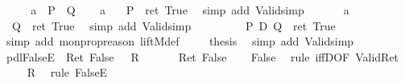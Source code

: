 \begin{isabellebody}
\isamarkupfalse%
\ {\isacharminus}\isanewline
\ \ \isamarkupfalse%
\ a{\isacharcolon}\ {\isachardoublequote}{\isasymturnstile}\ P{\isachardoublequote}\ {\isachardoublequote}{\isasymturnstile}\ Q{\isachardoublequote}\isanewline
\ \ \isamarkupfalse%
\ a\ \isamarkupfalse%
\ {\isachardoublequote}{\isasymDown}\ P\ {\isacharequal}\ ret\ True{\isachardoublequote}\ \isamarkupfalse%
\ {\isacharparenleft}simp\ add{\isacharcolon}\ Valid{\isacharunderscore}simp{\isacharparenright}\isanewline
\ \ \isamarkupfalse%
\isanewline
\ \ \isamarkupfalse%
\ a\ \isamarkupfalse%
\ {\isachardoublequote}{\isasymDown}\ Q\ {\isacharequal}\ ret\ True{\isachardoublequote}\ \isamarkupfalse%
\ {\isacharparenleft}simp\ add{\isacharcolon}\ Valid{\isacharunderscore}simp{\isacharparenright}\isanewline
\ \ \isamarkupfalse%
\ \isanewline
\ \ \isamarkupfalse%
\ {\isachardoublequote}{\isasymDown}\ {\isacharparenleft}P\ {\isasymand}\isactrlsub D\ Q{\isacharparenright}\ {\isacharequal}\ ret\ True{\isachardoublequote}\isanewline
\ \ \ \ \isamarkupfalse%
\ {\isacharparenleft}simp\ add{\isacharcolon}\ mon{\isacharunderscore}prop{\isacharunderscore}reason\ liftM{}{\isacharunderscore}def{\isacharparenright}\ \isanewline
\ \ \isamarkupfalse%
\ {\isacharquery}thesis\ \isamarkupfalse%
\ {\isacharparenleft}simp\ add{\isacharcolon}\ Valid{\isacharunderscore}simp{\isacharparenright}\isanewline
\isamarkupfalse%
\isamarkupfalse%
%
\isamarkuptrue%
\ pdl{\isacharunderscore}FalseE{\isacharcolon}\ {\isachardoublequote}{\isasymturnstile}\ Ret\ False\ {\isasymLongrightarrow}\ {\isasymturnstile}\ R{\isachardoublequote}\isanewline
\isamarkupfalse%
\ {\isacharminus}\isanewline
\ \ \isamarkupfalse%
\ {\isachardoublequote}{\isasymturnstile}\ Ret\ False{\isachardoublequote}\isanewline
\ \ \isamarkupfalse%
\ {\isachardoublequote}False{\isachardoublequote}\ \isamarkupfalse%
\ {\isacharparenleft}rule\ iffD{}{\isacharbrackleft}OF\ Valid{\isacharunderscore}Ret{\isacharbrackright}{\isacharparenright}\isanewline
\ \ \isamarkupfalse%
\ {\isachardoublequote}{\isasymturnstile}\ R{\isachardoublequote}\ \isamarkupfalse%
\ {\isacharparenleft}rule\ FalseE{\isacharparenright}\isanewline

\end{isabellebody}
